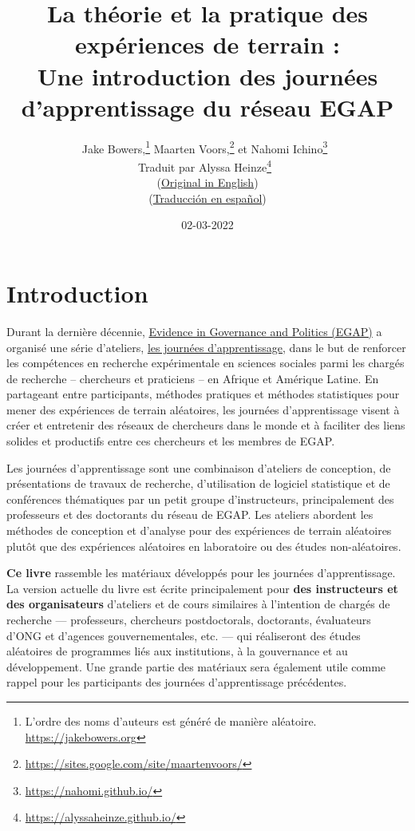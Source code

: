 \documentclass[12pt,]{book}
\title{La théorie et la pratique des expériences de terrain :\\
Une introduction des journées d'apprentissage du réseau EGAP}
\author{Jake Bowers,\footnote{L'ordre des noms d'auteurs est généré de manière aléatoire. \url{https://jakebowers.org}} Maarten Voors,\footnote{\url{https://sites.google.com/site/maartenvoors/}} et Nahomi Ichino\footnote{\url{https://nahomi.github.io/}}~\\
Traduit par Alyssa Heinze\footnote{\url{https://alyssaheinze.github.io/}}~\\
(\href{https://egap.github.io/theory_and_practice_of_field_experiments/}{Original in English})\\
(\href{https://egap.github.io/theory_and_practice_of_field_experiments_spanish/}{Traducción en español})}
\date{02-03-2022}
\begin{document}
\maketitle

\captionsetup[table]{list=no}
\captionsetup[figure]{list=no}

{
\hypersetup{linkcolor=}
\setcounter{tocdepth}{1}
\tableofcontents
}
\hypertarget{introduction}{%
\chapter{Introduction}\label{introduction}}

Durant la dernière décennie, \href{https://egap.org/}{Evidence in Governance and Politics (EGAP)} a organisé une série d'ateliers, \href{https://egap.org/learning-days/}{les journées d'apprentissage}, dans le but de renforcer les compétences en recherche expérimentale en sciences sociales parmi les chargés de recherche -- chercheurs et praticiens -- en Afrique et Amérique Latine. En partageant entre participants, méthodes pratiques et méthodes statistiques pour mener des expériences de terrain aléatoires, les journées d'apprentissage visent à créer et entretenir des réseaux de chercheurs dans le monde et à faciliter des liens solides et productifs entre ces chercheurs et les membres de EGAP.

Les journées d'apprentissage sont une combinaison d'ateliers de conception, de présentations de travaux de recherche, d'utilisation de logiciel statistique et de conférences thématiques par un petit groupe d'instructeurs, principalement des professeurs et des doctorants du réseau de EGAP. Les ateliers abordent les méthodes de conception et d'analyse pour des expériences de terrain aléatoires plutôt que des expériences aléatoires en laboratoire ou des études non-aléatoires.

\textbf{Ce livre} rassemble les matériaux développés pour les journées d'apprentissage. La version actuelle du livre est écrite principalement pour \textbf{des instructeurs et des organisateurs} d'ateliers et de cours similaires à l'intention de chargés de recherche --- professeurs, chercheurs postdoctorals, doctorants, évaluateurs d'ONG et d'agences gouvernementales, etc. --- qui réaliseront des études aléatoires de programmes liés aux institutions, à la gouvernance et au développement. Une grande partie des matériaux sera également utile comme rappel pour les participants des journées d'apprentissage précédentes.
\end{document}
